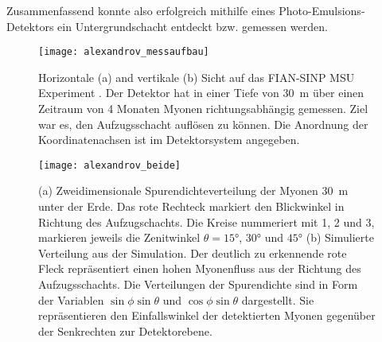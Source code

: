 Zusammenfassend konnte also erfolgreich mithilfe eines Photo-Emulsions-Detektors
 ein Untergrundschacht entdeckt bzw. gemessen werden.

\begin{figure}
    \centering
    \texttt{[image: alexandrov\_messaufbau]}
    \caption{Horizontale (a) and vertikale (b) Sicht auf das FIAN-SINP MSU Experiment \cite{Alexandrov2017}.
    Der Detektor hat in einer Tiefe von \SI[]{30}[]{m} über einen Zeitraum von 4 Monaten
    Myonen richtungsabhängig gemessen. Ziel war es, den Aufzugsschacht auflösen zu können.
    Die Anordnung der Koordinatenachsen ist im Detektorsystem angegeben.}
    \label{fig:alexandrov_messaufbau}
\end{figure}

\begin{figure}
    \centering
    \texttt{[image: alexandrov\_beide]}
    \caption{
        (a) Zweidimensionale Spurendichteverteilung der Myonen
        \SI[]{30}[]{m} unter der Erde. 
        Das rote Rechteck markiert den Blickwinkel in Richtung des Aufzugschachts. 
        Die Kreise nummeriert mit 1, 2 und 3, markieren jeweils die Zenitwinkel $\theta = 15°$, $30°$ und $45°$
        (b) 
        Simulierte Verteilung aus der Simulation. Der deutlich zu erkennende rote Fleck
        repräsentiert einen hohen Myonenfluss aus der Richtung des Aufzugsschachts.
        Die Verteilungen der Spurendichte sind in Form der Variablen $\sin \phi \sin \theta$ 
        und $\cos \phi \sin \theta$ dargestellt. Sie repräsentieren den Einfallswinkel der detektierten Myonen
        gegenüber der Senkrechten zur Detektorebene.
        \cite{Alexandrov2017}
    }
    \label{fig:alexandrov_ergebnisse}
\end{figure}



